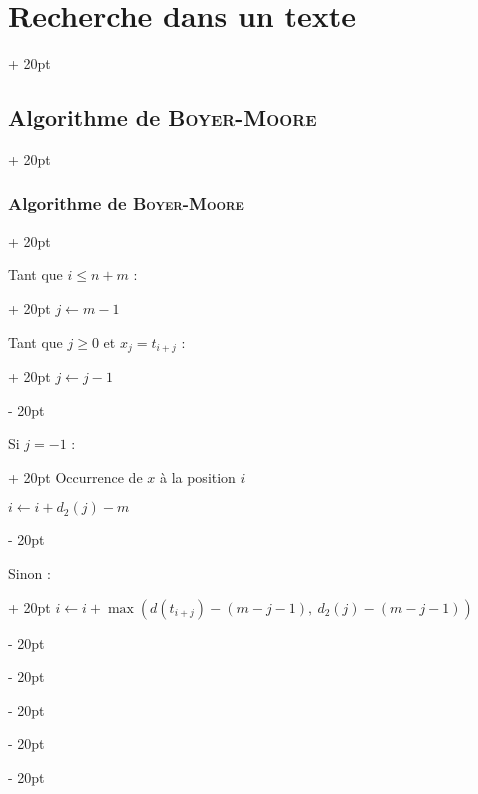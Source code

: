 \documentclass[a4paper, 12pt, twoside]{article}
\newcommand{\lr}[1]{\left( #1 \right)}
\renewcommand{\le}{\leqslant}
\renewcommand{\ge}{\geqslant}
\newcommand{\ind}[1][20pt]{\advance\leftskip + #1}
\newcommand{\deind}[1][20pt]{\advance\leftskip - #1}
\newenvironment{indt}[2][20pt]{#2 \par \ind[#1]}{\par \deind} %
\begin{document}
\begin{indt}{\section{Recherche dans un texte}}
\begin{indt}{\subsection{Algorithme de \textsc{Boyer-Moore}}}
\begin{indt}{\subsubsection{Algorithme de \textsc{Boyer-Moore}}}
\begin{pseudocode}
                    \begin{indt}{Tant que $i \le n + m$ :}
                        $j \leftarrow m - 1$
                        
                        \vspace{6pt}
                        
                        \begin{indt}{Tant que $j \ge 0$ et $x_j = t_{i + j}$ :}
                            $j \leftarrow j - 1$
                        \end{indt}
                        
                        \vspace{6pt}
                        
                        \begin{indt}{Si $j = -1$ :}
                            Occurrence de $x$ à la position $i$
                            
                            $i \leftarrow i + d_2(j) - m$
                        \end{indt}
                        
                        \vspace{6pt}
                        
                        \begin{indt}{Sinon :}
                            $i \leftarrow i + \max\!\lr{d(t_{i + j}) - (m - j - 1),\ d_2(j) - (m - j - 1)}$
                        \end{indt}
                    \end{indt}
                \end{pseudocode}
            \end{indt}
        \end{indt}
        
    \end{indt}
    
    
    
\end{document}
